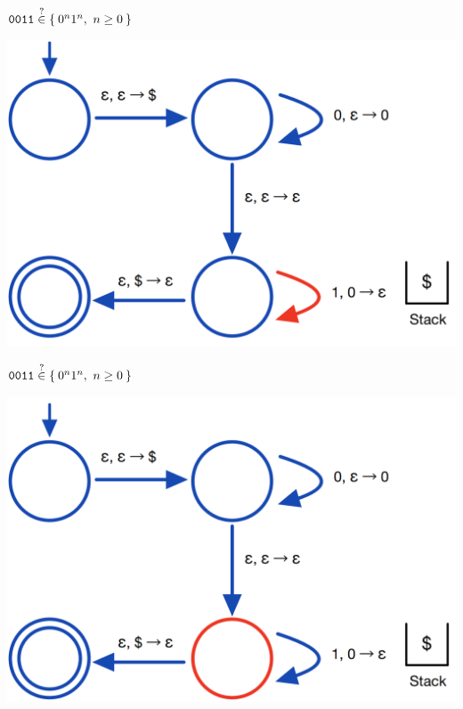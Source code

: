\documentclass[aspectratio=169]{beamer}
\begin{document}
\begin{frame}{$\texttt{0011} \stackrel{?}{\in} \Set{0^n 1^n,\ n \geq 0}$}
    \begin{center}
        \includegraphics[scale=0.30]{images/pda_comp/PDA_Comp_12.png}
    \end{center}
\end{frame}

\begin{frame}{$\texttt{0011} \stackrel{?}{\in} \Set{0^n 1^n,\ n \geq 0}$}
    \begin{center}
        \includegraphics[scale=0.30]{images/pda_comp/PDA_Comp_13.png}
    \end{center}
\end{frame}
\end{document}
